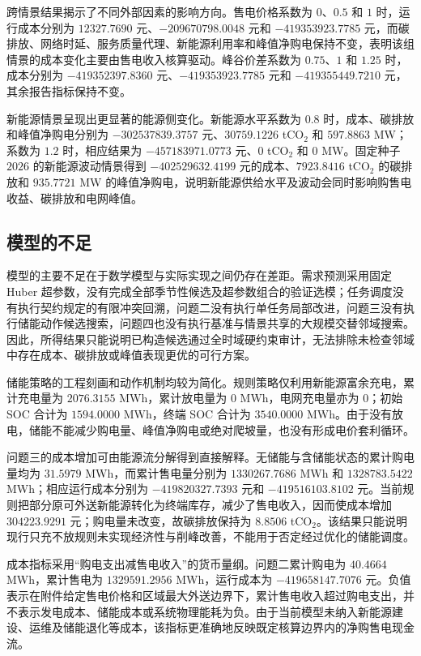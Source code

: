\documentclass[withoutpreface,bwprint]{cumcmthesis}
\begin{document}
跨情景结果揭示了不同外部因素的影响方向。售电价格系数为 $0$、$0.5$ 和 $1$ 时，运行成本分别为 $12327.7690$ 元、$-209670798.0048$ 元和 $-419353923.7785$ 元，而碳排放、网络时延、服务质量代理、新能源利用率和峰值净购电保持不变，表明该组情景的成本变化主要由售电收入核算驱动。峰谷价差系数为 $0.75$、$1$ 和 $1.25$ 时，成本分别为 $-419352397.8360$ 元、$-419353923.7785$ 元和 $-419355449.7210$ 元，其余报告指标保持不变。

新能源情景呈现出更显著的能源侧变化。新能源水平系数为 $0.8$ 时，成本、碳排放和峰值净购电分别为 $-302537839.3757$ 元、$30759.1226$ tCO$_2$ 和 $597.8863$ MW；系数为 $1.2$ 时，相应结果为 $-457183971.0773$ 元、$0$ tCO$_2$ 和 $0$ MW。固定种子 $2026$ 的新能源波动情景得到 $-402529632.4199$ 元的成本、$7923.8416$ tCO$_2$ 的碳排放和 $935.7721$ MW 的峰值净购电，说明新能源供给水平及波动会同时影响购售电收益、碳排放和电网峰值。

\subsection{模型的不足}

模型的主要不足在于数学模型与实际实现之间仍存在差距。需求预测采用固定 Huber 超参数，没有完成全部季节性候选及超参数组合的验证选模；任务调度没有执行契约规定的有限冲突回溯，问题二没有执行单任务局部改进，问题三没有执行储能动作候选搜索，问题四也没有执行基准与情景共享的大规模交替邻域搜索。因此，所得结果只能说明已构造候选通过全时域硬约束审计，无法排除未检查邻域中存在成本、碳排放或峰值表现更优的可行方案。

储能策略的工程刻画和动作机制均较为简化。规则策略仅利用新能源富余充电，累计充电量为 $2076.3155$ MWh，累计放电量为 $0$ MWh，电网充电量亦为 $0$；初始 SOC 合计为 $1594.0000$ MWh，终端 SOC 合计为 $3540.0000$ MWh。由于没有放电，储能不能减少购电量、峰值净购电或绝对爬坡量，也没有形成电价套利循环。

问题三的成本增加可由能源流分解得到直接解释。无储能与含储能状态的累计购电量均为 $31.5979$ MWh，而累计售电量分别为 $1330267.7686$ MWh 和 $1328783.5422$ MWh；相应运行成本分别为 $-419820327.7393$ 元和 $-419516103.8102$ 元。当前规则把部分原可外送新能源转化为终端库存，减少了售电收入，因而使成本增加 $304223.9291$ 元；购电量未改变，故碳排放保持为 $8.8506$ tCO$_2$。该结果只能说明现行只充不放规则未实现经济性与削峰改善，不能用于否定经过优化的储能调度。

成本指标采用“购电支出减售电收入”的货币量纲。问题二累计购电为 $40.4664$ MWh，累计售电为 $1329591.2956$ MWh，运行成本为 $-419658147.7076$ 元。负值表示在附件给定售电价格和区域最大外送边界下，累计售电收入超过购电支出，并不表示发电成本、储能成本或系统物理能耗为负。由于当前模型未纳入新能源建设、运维及储能退化等成本，该指标更准确地反映既定核算边界内的净购售电现金流。
\end{document}

